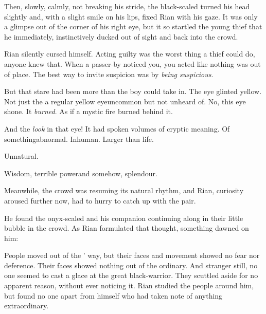 \begin{garbage}
Then, slowly, calmly, not breaking his stride, the black-scaled \dax{} turned his head slightly and, with a slight smile on his lips, fixed Rian with his gaze. It was only a glimpse out of the corner of his right eye, 
but it so startled the young thief
that he immediately, instinctively ducked out of sight and back into the crowd. 

Rian silently cursed himself. 
 Acting guilty was the worst thing a thief could do, anyone knew that. When a passer-by noticed you, you acted like nothing was out of place. The best way to invite suspicion was by \emph{being suspicious}. 

But that stare had been more than the boy could take in. 
The eye glinted yellow. 
Not just the a regular yellow eye\dash uncommon but not unheard of. 
No, this eye shone. It \emph{burned}. 
As if a mystic fire burned behind it. 

And the \emph{look} in that eye! It had spoken volumes of cryptic meaning. Of something\prikker abnormal. Inhuman. Larger than life. 

Unnatural. 

Wisdom, terrible power\prikker and somehow, splendour. 


Meanwhile, the crowd was resuming its natural rhythm, and Rian, curiosity aroused further now, had to hurry to catch up with the pair. 

He found the onyx-scaled \dax{} and his companion continuing along in their little bubble in the crowd. As Rian formulated that thought, something dawned on him: 


People moved out of the \travelers' way, but their faces and movement showed no fear nor deference. Their faces showed nothing out of the ordinary. And stranger still, no one seemed to cast a glace at the great black-\armoured warrior. They scuttled aside for no apparent reason, without ever noticing it. Rian studied the people around him, but found no one apart from himself who had taken note of anything extraordinary.


\end{garbage}
